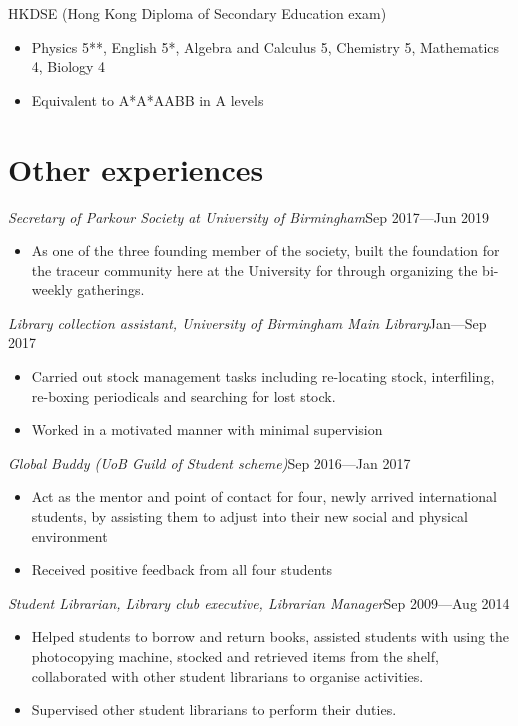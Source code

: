 \documentclass[a4paper, 12pt]{article}
\newcommand{\expentry}[3]{\emph{#1}\hfill{#2}---{#3}}
\begin{document}
    HKDSE (Hong Kong Diploma of Secondary Education exam)
    \begin{itemize}
    \setlength\itemsep{0em}
    \item Physics 5**, English 5*, Algebra and Calculus 5, Chemistry 5, Mathematics 4, Biology 4
    \item Equivalent to A*A*AABB in A levels
    \end{itemize}
\section{Other experiences}
\expentry{Secretary of Parkour Society at University of Birmingham}{Sep 2017}{Jun 2019}
    \begin{itemize}
    \setlength\itemsep{0em}
    \item As one of the three founding member of the society, built the foundation for the traceur community here at the University for through organizing the bi-weekly gatherings.
    \end{itemize}
\expentry{Library collection assistant, University of Birmingham Main Library}{Jan}{Sep 2017}
    \begin{itemize}
    \setlength\itemsep{0em}
    \item Carried out stock management tasks including re-locating stock, interfiling, re-boxing periodicals and searching for lost stock.
    \item Worked in a motivated manner with minimal supervision
    \end{itemize}
\expentry{Global Buddy (UoB Guild of Student scheme)}{Sep 2016}{Jan 2017}
    \begin{itemize}
    \setlength\itemsep{0em}
    \item Act as the mentor and point of contact for four, newly arrived international students, by assisting them to adjust into their new social and physical environment
    \item Received positive feedback from all four students
    \end{itemize}
\expentry{Student Librarian, Library club executive, Librarian Manager}{Sep 2009}{Aug 2014}
    \begin{itemize}
    \setlength\itemsep{0em}
    \item Helped students to borrow and return books, assisted students with using the photocopying machine, stocked and retrieved items from the shelf, collaborated with other student librarians to organise activities.
    \item Supervised other student librarians to perform their duties.
    \end{itemize}
\end{document}
